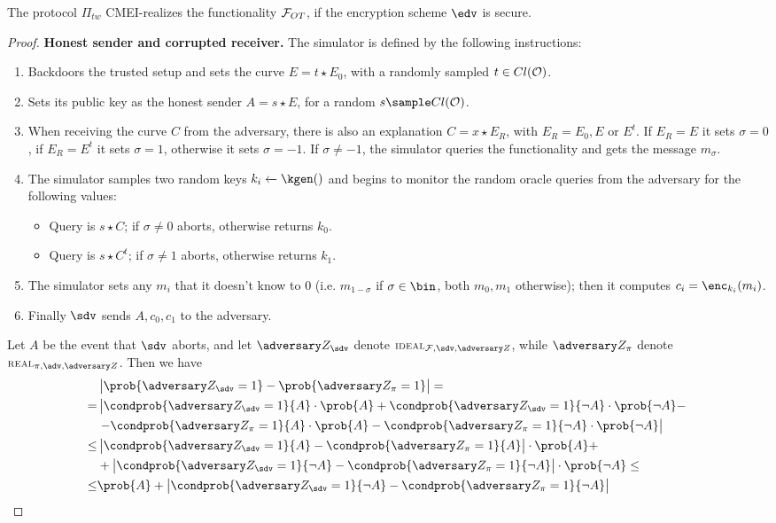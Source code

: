 \begin{theorem}
    The protocol $\Pi_{tw}$ CMEI-realizes the functionality $\mathcal{F}_{OT}$, if the encryption scheme $\edv$ is \indcpa secure.
\end{theorem}
\begin{proof}
    \textbf{Honest sender and corrupted receiver.} The simulator is defined by the following instructions:
    \begin{enumerate}
        \item Backdoors the trusted setup and sets the curve $E=t\star E_0$, with a randomly sampled $t\in Cl(\mathcal{O})$.
        \item Sets its public key as the honest sender $A=s\star E$, for a random $s\sample Cl(\Oc)$.
        \item When receiving the curve $C$ from the adversary, there is also an explanation $C=x\star E_R$, with $E_R=E_0,E$ or $E^t$. If $E_R=E$ it sets $\sigma=0$, if $E_R=E^t$ it sets $\sigma=1$, otherwise it sets $\sigma=-1$. If $\sigma\neq -1$, the simulator queries the functionality and gets the message $m_\sigma$.
        \item The simulator samples two random keys $k_i\xleftarrow{}\kgen()$ and begins to monitor the random oracle queries from the adversary for the following values:
        \begin{itemize}
            \item Query is $s\star C$; if $\sigma\neq0$ aborts, otherwise returns $k_0$.
            \item Query is $s\star C^t$; if $\sigma\neq1$ aborts, otherwise returns $k_1$.
        \end{itemize}
        \item The simulator sets any $m_i$ that it doesn't know to $0$ (i.e. $m_{1-\sigma}$ if $\sigma\in\bin$, both $m_0,m_1$ otherwise); then it computes $c_i=\enc_{k_i}(m_i)$.
        \item Finally $\sdv$ sends $A,c_0,c_1$ to the adversary.
    \end{enumerate}
    
    Let $A$ be the event that $\sdv$ aborts, and let $\zdv_\sdv$ denote $\textsc{\scriptsize IDEAL}_{\Fun,\sdv,\zdv}$, while $\zdv_\pi$ denote $\textsc{\scriptsize REAL}_{\pi,\adv,\zdv}$. Then we have
    \begin{align*}
         & \left|\prob{\zdv_\sdv=1}-\prob{\zdv_\pi=1}\right| =\\
        = & \left|\condprob{\zdv_\sdv=1}{A}\cdot\prob{A} + \condprob{\zdv_\sdv=1}{\neg A}\cdot\prob{\neg A} -\right.\\
        & \left.- \condprob{\zdv_\pi=1}{A}\cdot\prob{A} - \condprob{\zdv_\pi=1}{\neg A}\cdot\prob{\neg A}\right| \\
        \le & \left| \condprob{\zdv_\sdv=1}{A} - \condprob{\zdv_\pi=1}{A}\right|\cdot\prob{A}  +\\
         &+ \left| \condprob{\zdv_\sdv=1}{\neg A} - \condprob{\zdv_\pi=1}{\neg A}\right|\cdot\prob{\neg A} \le \\
        \le & \prob{A} + \left| \condprob{\zdv_\sdv=1}{\neg A} - \condprob{\zdv_\pi=1}{\neg A}\right|
    \end{align*}


\end{proof}
